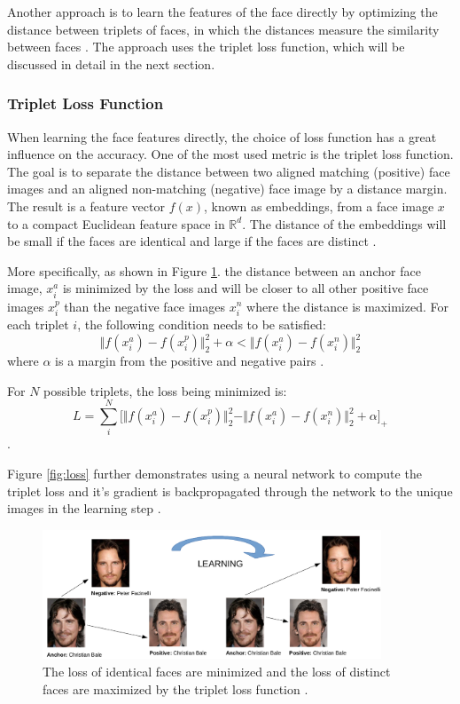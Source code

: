 \documentclass[12pt,english]{article}
\begin{document}
Another approach is to learn the features of the face directly by optimizing the distance between triplets of faces, in which the distances measure the similarity between faces \cite{trigueros} \cite{schroff}. The approach uses the triplet loss function, which will be discussed in detail in the next section.

\subsubsection{Triplet Loss Function}
\quad
When learning the face features directly, the choice of loss function has a great influence on the accuracy. One of the most used metric is the triplet loss function. The goal is to separate the distance between two aligned matching (positive) face images and an aligned non-matching (negative) face image by a distance margin. The result is a feature vector $f(x)$, known as embeddings, from a face image $x$ to a compact Euclidean feature space in $ \mathbb{R}^{d}$. The distance of the embeddings will be small if the faces are identical and large if the faces are distinct \cite{schroff}.


More specifically, as shown in Figure \ref{fig:bale}. the distance between an anchor face image, $x_{i}^{a}$ is minimized by the loss and will be closer to all other positive face images $x_{i}^{p}$ than the negative face images $x_{i}^{n}$ where the distance is maximized. For each triplet $i$, the following condition needs to be satisfied: $$\Vert f(x_{i}^{a}) - f(x_{i}^{p}) \Vert_{2}^{2} + \alpha < \Vert f(x_{i}^{a}) - f(x_{i}^{n}) \Vert_{2}^{2} $$
where $\alpha$ is a margin from the positive and negative pairs \cite{trigueros}.

For $N$ possible triplets, the loss being minimized is: $$ L = \sum_{i}^{N} \Big[ \Vert f(x_{i}^{a}) - f(x_{i}^{p}) \Vert_{2}^{2} - \Vert f(x_{i}^{a}) - f(x_{i}^{n}) \Vert_{2}^{2} + \alpha\Big]_{+} $$.

Figure \ref{fig:loss} further demonstrates using a neural network to compute the triplet loss and it's gradient is backpropagated through the network to the unique images in the learning step \cite{amos}.

\begin{figure}[!tbp]
 \centering
    \includegraphics[width=0.9\textwidth]{figures/triplet_loss_example.png}
    \caption{The loss of identical faces are minimized and the loss of distinct faces are maximized by the triplet loss function \cite{pic1} \cite{pic2}.}
	\label{fig:bale}
\end{figure}
\end{document}
